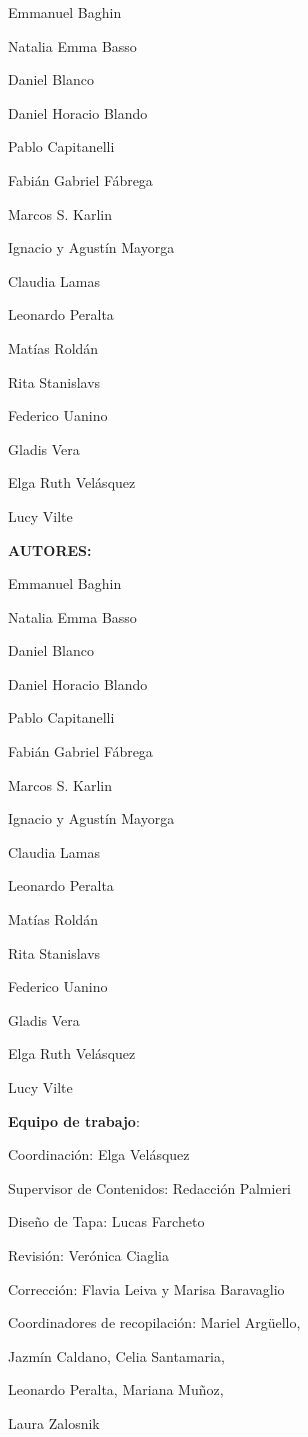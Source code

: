 Emmanuel Baghin

Natalia Emma Basso

Daniel Blanco

Daniel Horacio Blando

Pablo Capitanelli

Fabián Gabriel Fábrega

Marcos S. Karlin

Ignacio y Agustín Mayorga

Claudia Lamas

Leonardo Peralta

Matías Roldán

Rita Stanislavs

Federico Uanino

Gladis Vera

Elga Ruth Velásquez

Lucy Vilte




\textbf{AUTORES:}

Emmanuel Baghin

Natalia Emma Basso

Daniel Blanco

Daniel Horacio Blando

Pablo Capitanelli

Fabián Gabriel Fábrega

Marcos S. Karlin

Ignacio y Agustín Mayorga

Claudia Lamas

Leonardo Peralta

Matías Roldán

Rita Stanislavs

Federico Uanino

Gladis Vera

Elga Ruth Velásquez

Lucy Vilte

\textbf{Equipo de trabajo}:

Coordinación: Elga Velásquez

Supervisor de Contenidos: Redacción Palmieri

Diseño de Tapa: Lucas Farcheto

Revisión: Verónica Ciaglia

Corrección: Flavia Leiva y Marisa Baravaglio

Coordinadores de recopilación: Mariel Argüello,

Jazmín Caldano, Celia Santamaria,

Leonardo Peralta, Mariana Muñoz,

Laura Zalosnik
